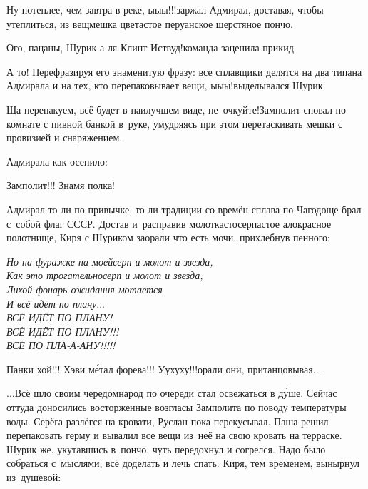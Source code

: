 \diagdash Ну потеплее, чем завтра в реке, ы\sdash ы\sdash ы!!!\mdash заржал Адмирал, доставая, чтобы утеплиться, из вещмешка цветастое перуанское шерстяное пончо.

\diagdash Ого, пацаны, Шурик а-ля Клинт Иствуд!\mdash команда заценила прикид.

\diagdash А то! Перефразируя его знаменитую фразу: все сплавщики делятся на два типа\mdash на Адмирала и на тех, кто перепаковывает вещи, ы\sdash ы\sdash ы!\mdash выделывался Шурик.

\diagdash Ща перепакуем, всё будет в наилучшем виде, не~очкуйте!\mdash Замполит сновал по комнате с пивной банкой в~руке, умудряясь при этом перетаскивать мешки с провизией и снаряжением.

Адмирала как осенило:

\diagdash Замполит!!! Знамя полка!

Адмирал то ли по привычке, то ли традиции со времён сплава по Чагодоще брал с~собой флаг СССР. Достав и~расправив молоткасто\sdash серпастое ало\sdash красное полотнище, Киря с Шуриком заорали что есть мочи, прихлебнув пенного:

\newpage
\vspace{0.5cm}
\noindent\textit{%
	\hspace*{1.2cm}Но на фуражке на моей\mdash серп и молот и звезда,\\
	\hspace*{1.2cm}Как это трогательно\mdash серп и молот и звезда,\\
	\hspace*{1.2cm}Лихой фонарь ожидания мотается\\
	\hspace*{1.2cm}И всё идёт по плану$\ldots$\\
	\hspace*{1.2cm}\large{ВСЁ ИДЁТ ПО ПЛАНУ!}\\
	\hspace*{1.2cm}\Large{ВСЁ ИДЁТ ПО ПЛАНУ!!!}\\
	\hspace*{1.2cm}\LARGE{ВСЁ ПО ПЛА-А-АНУ!!!!!}
}

\vspace{0.5cm}
\diagdash Панки хой!!! Хэви м\'{е}тал форева!!! У\sdash у\sdash х\sdash у\sdash х\sdash у!!!\mdash орали они, пританцовывая$\ldots$

$\ldots$Всё шло своим чередом\mdash народ по очереди стал освежаться в д\'{у}ше. Сейчас оттуда доносились восторженные возгласы Замполита по поводу температуры воды. Серёга разлёгся на кровати, Руслан пока перекусывал. Паша решил перепаковать герму и вывалил все вещи из~неё на свою кровать на терраске. Шурик же, укутавшись в~пончо, чуть передохнул и согрелся. Надо было собраться с~мыслями, всё доделать и лечь спать. Киря, тем временем, вынырнул из~душевой:

